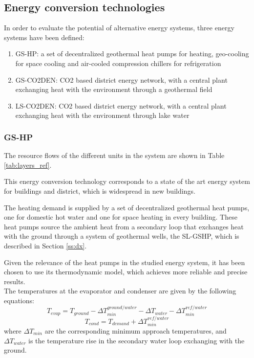 \documentclass{article}
\begin{document}


\subsection{Energy conversion technologies}

In order to evaluate the potential of alternative energy systems, three energy systems have been defined:
\begin{enumerate}
	\item GS-HP: a set of decentralized geothermal heat pumps for heating, geo-cooling for space cooling and air-cooled compression chillers for refrigeration
	\item GS-CO2DEN: CO2 based district energy network, with a central plant exchanging heat with the environment through a geothermal field
	\item LS-CO2DEN: CO2 based district energy network, with a central plant exchanging heat with the environment through lake water
\end{enumerate}

\subsubsection{GS-HP}
The resource flows of the different units in the system are shown in Table \ref{tab:layers_ref}.


This energy conversion technology corresponds to a state of the art energy system for buildings and district, which is widespread in new buildings.

The heating demand is supplied by a set of decentralized geothermal heat pumps, one for domestic hot water and one for space heating in every building. These heat pumps source the ambient heat from a secondary loop that exchanges heat with the ground through a system of geothermal wells, the SL-GSHP, which is described in Section \ref{ss:dx}. 

Given the relevance of the heat pumps in the studied energy system, it has been chosen to use its thermodynamic model, which achieves more reliable and precise results.\\

The temperatures at the evaporator and condenser are given by the following equations:
\begin{equation}
    T_{evap} = T_{ground} - \Delta T_{min}^{ground/water} - \Delta T_{water} - \Delta T_{min}^{ref/water}
\end{equation}
\begin{equation}
    T_{cond} = T_{demand} + \Delta T_{min}^{ref/water}
\end{equation}
where $\Delta T_{min}$ are the corresponding minimum approach temperatures, and $\Delta T_{water}$ is the temperature rise in the secondary water loop exchanging with the ground.
\end{document}
